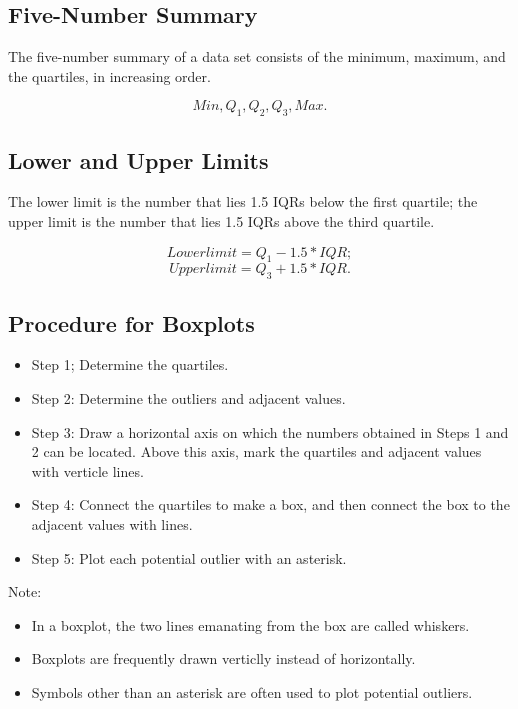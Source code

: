 \documentclass[12pt]{article}
\begin{document}
        \subsection*{Five-Number Summary}
            The five-number summary of a data set consists of the minimum, maximum, and the quartiles, in increasing order.
            \begin{center}
                \[
                    Min, Q_1, Q_2, Q_3, Max.    
                \]
            \end{center}
        \subsection*{Lower and Upper Limits}
            The lower limit is the number that lies 1.5 IQRs below the first quartile; the upper limit is the number that lies 1.5 
            IQRs above the third quartile.
            \begin{center}
                \[
                    Lower limit = Q_1 - 1.5 * IQR;
                \]
                \[
                    Upper limit = Q_3 + 1.5 * IQR.  
                \]
            \end{center}
        \subsection*{Procedure for Boxplots}
            \begin{itemize}
                \item{Step 1;} Determine the quartiles.
                \item{Step 2:} Determine the outliers and adjacent values.
                \item{Step 3:} Draw a horizontal axis on which the numbers obtained in Steps 1 and 2 can be located. Above this axis,
                mark the quartiles and adjacent values with verticle lines.
                \item{Step 4:} Connect the quartiles to make a box, and then connect the box to the adjacent values with lines.
                \item{Step 5:} Plot each potential outlier with an asterisk.
            \end{itemize}
            Note:
            \begin{itemize}
                \item In a boxplot, the two lines emanating from the box are called whiskers.
                \item Boxplots are frequently drawn verticlly instead of horizontally.
                \item Symbols other than an asterisk are often used to plot potential outliers.
            \end{itemize}
\end{document}
